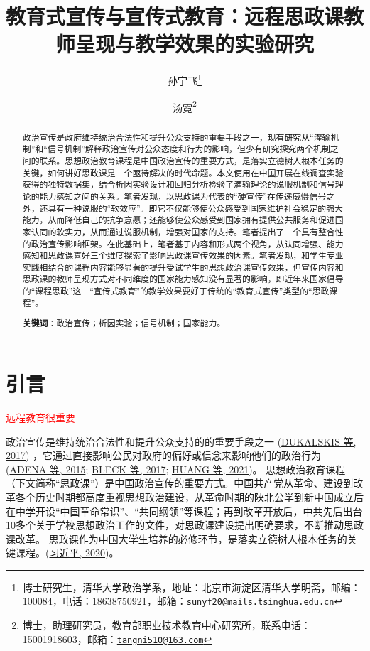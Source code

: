 \documentclass[
  12pt,
]{ctexart}
\title{教育式宣传与宣传式教育：远程思政课教师呈现与教学效果的实验研究}
\author{孙宇飞\footnote{博士研究生，清华大学政治学系，地址：北京市海淀区清华大学明斋，邮编：100084，电话：18638750921，邮箱：\href{mailto:sunyf20@mails.tsinghua.edu.cn}{\nolinkurl{sunyf20@mails.tsinghua.edu.cn}}} \and 汤霓\footnote{博士，助理研究员，教育部职业技术教育中心研究所，联系电话：15001918603，邮箱：\href{mailto:tangni510@163.com}{\nolinkurl{tangni510@163.com}}}}
\date{}
\begin{document}
\maketitle
\begin{abstract}
政治宣传是政府维持统治合法性和提升公众支持的重要手段之一，现有研究从``灌输机制''和``信号机制''解释政治宣传对公众态度和行为的影响，但少有研究探究两个机制之间的联系。思想政治教育课程是中国政治宣传的重要方式，是落实立德树人根本任务的关键，如何讲好思政课是一个亟待解决的时代命题。本文使用在中国开展在线调查实验获得的独特数据集，结合析因实验设计和回归分析检验了灌输理论的说服机制和信号理论的能力感知之间的关系。笔者发现，以思政课为代表的``硬宣传''在传递威慑信号之外，还具有一种说服的``软效应''。即它不仅能够使公众感受到国家维护社会稳定的强大能力，从而降低自己的抗争意愿；还能够使公众感受到国家拥有提供公共服务和促进国家认同的软实力，从而通过说服机制，增强对国家的支持。笔者提出了一个具有整合性的政治宣传影响框架。在此基础上，笔者基于内容和形式两个视角，从认同增强、能力感知和思政课喜好三个维度探索了影响思政课宣传效果的因素。笔者发现，和学生专业实践相结合的课程内容能够显著的提升受试学生的思想政治课宣传效果，但宣传内容和思政课的教师呈现方式对不同维度的国家能力感知没有显著的影响，即近年来国家倡导的``课程思政''这一``宣传式教育''的教学效果要好于传统的``教育式宣传''类型的``思政课程''。

\textbf{关键词}：政治宣传；析因实验；信号机制；国家能力。
\end{abstract}

\newpage

\hypertarget{ux5f15ux8a00}{%
\section{引言}\label{ux5f15ux8a00}}

\textcolor{red}{远程教育很重要}

政治宣传是维持统治合法性和提升公众支持的的重要手段之一 (\protect\hyperlink{ref-DukalskisGerschewski2017}{DUKALSKIS 等, 2017}) ，它通过直接影响公民对政府的偏好或信念来影响他们的政治行为 (\protect\hyperlink{ref-AdenaEtAl2015}{ADENA 等, 2015}; \protect\hyperlink{ref-BleckMichelitch2017}{BLECK 等, 2017}; \protect\hyperlink{ref-HuangCruz2021}{HUANG 等, 2021})。
思想政治教育课程（下文简称``思政课''）是中国政治宣传的重要方式。中国共产党从革命、建设到改革各个历史时期都高度重视思想政治建设，从革命时期的陕北公学到新中国成立后在中学开设``中国革命常识''、``共同纲领''等课程；再到改革开放后，中共先后出台10多个关于学校思想政治工作的文件，对思政课建设提出明确要求，不断推动思政课改革。
思政课作为中国大学生培养的必修环节，是落实立德树人根本任务的关键课程。(\protect\hyperlink{ref-XiJinPing2020}{习近平, 2020})。
\end{document}
